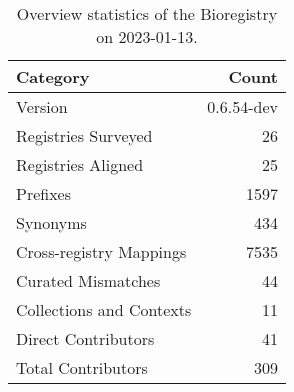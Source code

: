 \begin{table}
\centering
\caption{Overview statistics of the Bioregistry on 2023-01-13.}
\label{tab:bioregistry-summary}
\begin{tabular}{lr}
\toprule
                Category &      Count \\
\midrule
                 Version & 0.6.54-dev \\
     Registries Surveyed &         26 \\
      Registries Aligned &         25 \\
                Prefixes &       1597 \\
                Synonyms &        434 \\
 Cross-registry Mappings &       7535 \\
      Curated Mismatches &         44 \\
Collections and Contexts &         11 \\
     Direct Contributors &         41 \\
      Total Contributors &        309 \\
\bottomrule
\end{tabular}
\end{table}
